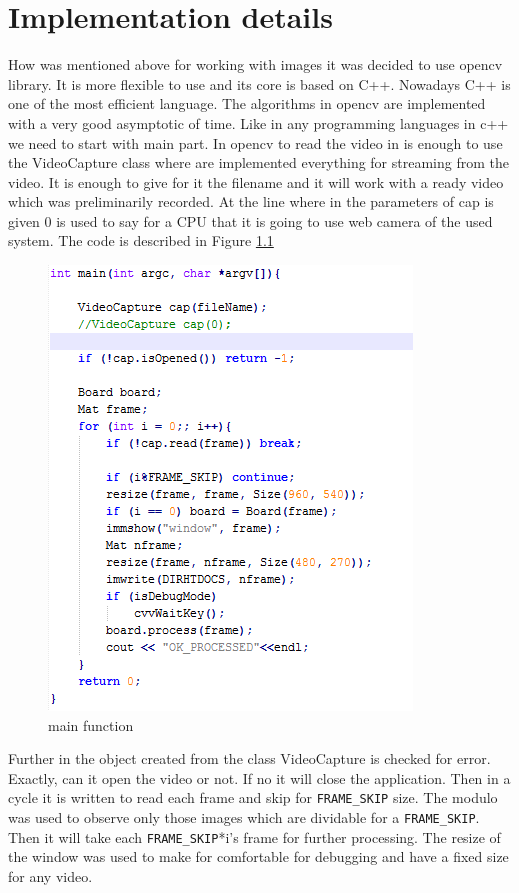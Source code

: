 \chapter{Implementation details}

How was mentioned above for working with images it was decided to use opencv library. It is more flexible to use and its core is based on C++. Nowadays C++ is one of the most efficient language. The algorithms in opencv are implemented with a very good asymptotic of time. Like in any programming languages in c++ we need to start with main part. In opencv to read the video in is enough to use the VideoCapture class where are implemented everything for streaming from the video. It is enough to give for it the filename and it will work with a ready video which was preliminarily recorded. At the line where in the parameters of cap is given 0 is used to say for a CPU that it is going to use web camera of the used system. The code is described in Figure \ref{fig:main_of_code}

\begin{figure}[h!]
    \centering
    \includegraphics[]{Figures/main_of_code}
    \caption{main function}
    \label{fig:main_of_code}
\end{figure}

Further in the object created from the class VideoCapture is checked for error. Exactly, can it open the video or not. If no it will close the application. Then in a cycle it is written to read each frame and skip for \verb|FRAME_SKIP| size. The modulo was used to observe only those images which are dividable for a \verb|FRAME_SKIP|. Then it will take each \verb|FRAME_SKIP|*i’s frame for further processing. The resize of the window was used to make for comfortable for debugging and have a fixed size for any video.
	
